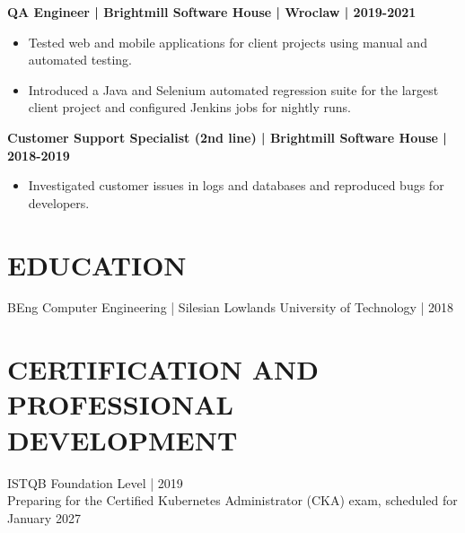 \documentclass[11pt,a4paper]{article}
\begin{document}
\textbf{QA Engineer | Brightmill Software House | Wroclaw | 2019-2021}
\begin{itemize}
\item Tested web and mobile applications for client projects using manual and automated testing.
\item Introduced a Java and Selenium automated regression suite for the largest client project and configured Jenkins jobs for nightly runs.
\end{itemize}

\textbf{Customer Support Specialist (2nd line) | Brightmill Software House | 2018-2019}
\begin{itemize}
\item Investigated customer issues in logs and databases and reproduced bugs for developers.
\end{itemize}

\section*{EDUCATION}
BEng Computer Engineering | Silesian Lowlands University of Technology | 2018

\section*{CERTIFICATION AND PROFESSIONAL DEVELOPMENT}
ISTQB Foundation Level | 2019\\
Preparing for the Certified Kubernetes Administrator (CKA) exam, scheduled for January 2027
\end{document}

